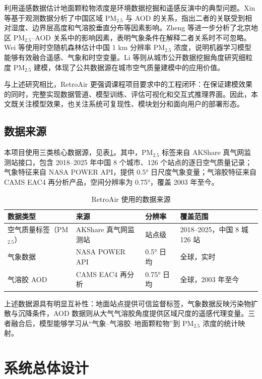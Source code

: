 \documentclass[UTF8,zihao=-4,a4paper]{ctexart}
\newcommand{\pmfine}{PM$_{2.5}$}
\newcommand{\aod}{AOD}
\begin{document}
利用遥感数据估计地面颗粒物浓度是环境数据挖掘和遥感反演中的典型问题。Xin 等\cite{xin2016}基于观测数据分析了中国区域 \pmfine{} 与 \aod{} 的关系，指出二者的关联受到相对湿度、边界层高度和气溶胶垂直分布等因素影响。Zheng 等\cite{zheng2017}进一步分析了北京地区 \pmfine{}--\aod{} 关系中的影响因素，表明气象条件在解释二者关系时不可忽略。Wei 等\cite{wei2019}使用时空随机森林估计中国 1 km 分辨率 \pmfine{} 浓度，说明机器学习模型能够有效融合遥感、气象和时空变量。Li 等\cite{li2017}则从城市公开数据挖掘角度研究细粒度 \pmfine{} 建模，体现了公共数据源在城市空气质量建模中的应用价值。

与上述研究相比，RetroAir 更强调课程项目要求中的工程闭环：在保证建模效果的同时，完整实现数据管道、模型训练、评估可视化和交互式推理界面。因此，本文既关注模型效果，也关注系统可复现性、模块划分和面向用户的部署形态。

\subsection{数据来源}

本项目使用三类核心数据源，见表\ref{tab:data_source}。其中，\pmfine{} 标签来自 AKShare 真气网监测站接口，包含 2018--2025 年中国 8 个城市、126 个站点的逐日空气质量记录；气象特征来自 NASA POWER API，提供 0.5° 日尺度气象变量；气溶胶特征来自 CAMS EAC4 再分析产品，空间分辨率为 0.75°，覆盖 2003 年至今。

\begin{table}[H]
  \centering
  \caption{RetroAir 使用的数据来源}
  \label{tab:data_source}
  \small
  \begin{tabularx}{\textwidth}{lllX}
    \toprule
    数据类型 & 来源 & 分辨率 & 覆盖范围 \\
    \midrule
    空气质量标签（\pmfine{}） & AKShare 真气网监测站 & 站点级 & 2018--2025，中国 8 城 126 站 \\
    气象数据 & NASA POWER API & 0.5° 日均 & 全球，实时 \\
    气溶胶 \aod{} & CAMS EAC4 再分析 & 0.75° 日均 & 全球，2003 年至今 \\
    \bottomrule
  \end{tabularx}
\end{table}

上述数据源具有明显互补性：地面站点提供可信监督标签，气象数据反映污染物扩散与沉降条件，\aod{} 数据则从大气气溶胶角度提供区域尺度的遥感代理变量。三者融合后，模型能够学习从“气象--气溶胶--地面颗粒物”到 \pmfine{} 浓度的统计映射。

\section{系统总体设计}
\end{document}
